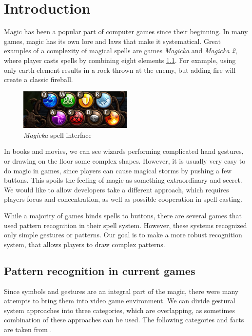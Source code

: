 \chapter{Introduction}
\label{chap:gf}

Magic has been a popular part of computer games since their beginning. In many games, magic has its own lore and laws that make it systematical. Great examples of a complexity of magical spells are games \emph{Magicka} and \emph{Magicka 2}, where player casts spells by combining eight elements \ref{fig:magicka}. For example, using only earth element results in a rock thrown at the enemy, but adding fire will create a classic fireball.
\begin{figure}[!htb]
  \centering
  \label{fig:magicka}
    \includegraphics[width=0.5\textwidth]{ext/magicka.png}
    \caption{\emph{Magicka} spell interface}
\end{figure}

In books and movies, we can see wizards performing complicated hand gestures, or drawing on the floor some complex shapes. However, it is usually very easy to do magic in games, since players can cause magical storms by pushing a few buttons. This spoils the feeling of magic as something extraordinary and secret. We would like to allow developers take a different approach, which requires players focus and concentration, as well as possible cooperation in spell casting.

While a majority of games binds spells to buttons, there are several games that used pattern recognition in their spell system. However, these systems recognized only simple gestures or patterns. Our goal is to make a more robust recognition system, that allows players to draw complex patterns.

\section{Pattern recognition in current games}

Since symbols and gestures are an integral part of the magic, there were many attempts to bring them into video game environment. We can divide gestural system approaches into three categories, which are overlapping, as sometimes combination of these approaches can be used. The following categories and facts are taken from \cite{gameMagic}.

